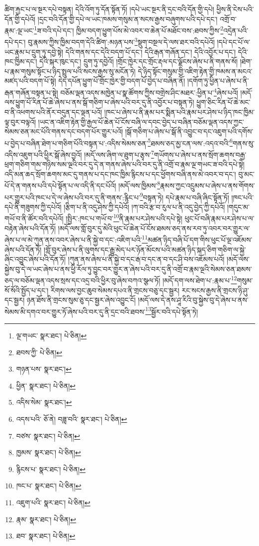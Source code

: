 ཚིག་རྐྱང་པ་ལ་སྔར་དཔེ་བསྟན། དེའི་འོག་ཏུ་དོན་སྟོན་ཏོ། །དཔེ་ཡང་སྔར་ནི་དྲང་བའི་དོན་གྱི་དཔེ། ཕྱིས་ནི་ངེས་པའི་དོན་གྱི་དཔེའོ། །དྲང་བའི་དོན་གྱི་དཔེ་ལ་ཡང་ཁམས་གསུམ་ན་སངས་རྒྱས་བཞུགས་པའི་དཔེ་དང་། འགྲོ་བ་རྣམ་:ལྔ་ཡང་\footnote{ལྔ་གཡང་  སྣར་ཐང་།  པེ་ཅིན། }ཟ་བའི་དཔེ་དང་། ཁྱིམ་བདག་ཕྱུག་པོས་མེ་འབར་བ་ཆེན་པོ་མཐོང་བས་:ཐབས་ཀྱིས་\footnote{ཐབས་ཀྱི་  པེ་ཅིན། }འདྲེན་པའི་དཔེ་དང་། བུ་རྣམས་ཀྱིས་ཁྱིམ་བདག་དེའི་ཚིག་:མཉན་པས་\footnote{གཉན་པས་  སྣར་ཐང་། }སྡུག་བསྔལ་དེ་ལས་ཐར་བའི་དཔེའོ། །དཔེ་དང་པོ་ལ་ཡང་རྣམ་པ་དྲུག་ཏུ་དབྱེ་སྟེ། དེའི་གནས་དང་དེའི་བདག་པོ་དང་། དེའི་རྒན་གཞོན་དང་། དེའི་འབྱོར་པ་དང་། དེའི་ཁང་ཁྱིམ་དང་། དེའི་སྐར་ཁུང་དང་། དྲུག་ཏུ་དབྱེའོ། །གྲོང་ཁྱེར་དང་གྲོང་རྡལ་དང་ལྗོངས་ཞེས་པ་ནི་གནས་སོ། །ཐེག་པ་རྣམ་གསུམ་སྟོང་པ་ཉིད་སྤྲུལ་པའི་སངས་རྒྱས་སུ་མངོན་ཏེ། དེ་ཉིད་སྟོང་གསུམ་གྱི་འཇིག་རྟེན་གྱི་ཁམས་ན་མངའ་མཛད་པའི་བདག་པོ་སྟེ། དེད་དཔོན་ཕྱུག་པོ་གྲོང་ཁྱེར་གྱི་བདག་པོ་བྱེད་པ་བཞིན་ནོ། །དགོག་ཏུ་ཕྱིན་པ་ཞེས་པ་ནི་རྒན་གཞོན་བསྟན་པ་སྟེ། བཅོམ་ལྡན་འདས་མཁྱེན་པ་སྣ་ཚོགས་ཀྱིས་བགྲེས་ཤིང་མཐར་:ཕྱིན་པ་\footnote{ཕྱིན་  སྣར་ཐང་།  པེ་ཅིན། }ཞེས་པའོ། །མདོ་ལས་ཕྱུག་པོ་རིན་པོ་ཆེ་ཞེས་པ་ནས་སྒོ་གཅིག་པ་ཞེས་པའི་བར་དུ་ནི་འབྱོར་པ་བསྟན་ཏེ། ཕྱུག་ཅིང་རིན་པོ་ཆེ་མང་བ་ནི་འཕགས་པའི་ནོར་བདུན་དང་ལྡན་པའོ། །ཁང་པ་ཞེས་པ་ནི་རྣམ་པར་སྨིན་པའི་རྣམ་པར་ཤེས་པ་ཉིད་ཁང་ཁྱིམ་ལྟ་བུར་བལྟའོ། །ཡང་ན་འཇིག་རྟེན་གྱི་རྒྱལ་པོ་ཆེན་པོ་ངོས་བཞི་ལ་དབང་བྱེད་པ་བཞིན་བཅོམ་ལྡན་འདས་ཀྱང་སེམས་ཅན་མང་པོའི་གནས་དང་བདག་པོར་གྱུར་པའོ། །སྒོ་གཅིག་པ་ཞེས་པ་སྒོ་ནི་འབྱུང་བ་དང་འཇུག་པའི་དགོས་པ་བྱེད་པ་བཞིན་ཐེག་པ་གཅིག་པོའི་བསྟན་པ་:འདིས་སེམས་ཅན་\footnote{འདིས་སེམ་  སྣར་ཐང་། }ཐམས་ཅད་མྱ་ངན་ལས་:འདའ་བའི་\footnote{འདས་པའི་  ཅོ་ནེ། བཟླ་བའི་  སྣར་ཐང་།  པེ་ཅིན། }གནས་སུ་འདིས་འཇུག་པའི་ཕྱིར་སྒོ་ཞེས་བྱའོ། །མདོ་ལས་ཞིག་ལ་ཐུག་པ་རྩྭས་\footnote{བཙས་  སྣར་ཐང་།  པེ་ཅིན། }གཡོགས་པ་ཞེས་པ་ནས་སྲོག་ཆགས་བརྒྱ་ཕྲག་གཅིག་གམ་གཉིས་སམ་ལྔའི་བར་དུ་དེ་ན་གནས་ཞེས་པའི་བར་དུ་ནི་འགྲོ་བ་རྣམ་ལྔ་གཡང་ཟ་བའི་དཔེ་སྟེ། འདི་མན་ཆད་སྲོག་ཆགས་མང་དུ་གནས་པ་དང་ཁང་ཁྱིམ་རྙིངས་པ་དང་ཕྱོགས་བཞི་ནས་མེ་འབར་བ་དང་། བུ་མང་པོ་དེ་ན་གནས་པའི་དཔེ་སྟོན་པ་ལ་འདི་ནི་དང་པོའོ། །མདོ་ལས་ཁྱིམས་\footnote{ཁྱམས་  སྣར་ཐང་།  པེ་ཅིན། }རྣམས་ཀྱང་འདྲུམས་པ་ཞེས་པ་ནས་གོགས་པར་གྱུར་པའི་ཁང་པ་དེ་ལ་ཞེས་པའི་བར་དུ་ནི་གནས་:རྙིང་པ་\footnote{རྙིངས་པ་  སྣར་ཐང་།  པེ་ཅིན། }བསྟན་ཏེ། དཔེ་རྣམ་པ་བཞི་ཞིང་སྟོན་ཏོ། །ཁང་པའི་དཔེ་ནི་གཟུགས་ཀྱི་དཔེའོ། །རྩིག་པ་ནི་འདུ་ཤེས་ཀྱི་དཔེའོ། །ཀ་བའི་རྩ་བ་རུལ་པ་ནི་འདུ་བྱེད་ཀྱི་དཔེའོ། །གདུང་མ་གཡོ་བ་ནི་ཚོར་བའི་དཔེའོ། །སྤྱིར་:ཁང་པ་གཡོ་བ་\footnote{ཁང་པ་  སྣར་ཐང་།  པེ་ཅིན། }ནི་རྣམ་པར་ཤེས་པའི་དཔེ་སྟེ། ཕུང་པོ་བཞི་རྣམ་པར་ཤེས་པ་ལ་བརྟེན་ཞེས་པའི་དོན་ཏོ། །མདོ་ལས་གློ་བུར་དུ་མེའི་ཕུང་པོ་ཆེན་པོ་ངོས་ཐམས་ཅད་ནས་རབ་ཏུ་འབར་བར་གྱུར་ལ་ཞེས་པ་ལ་མེ་ཀུན་ནས་འབར་ཞེས་པ་ནི་སྐྱེ་བ་དང་:འཇིག་པའི་\footnote{འཇུག་པའི་  སྣར་ཐང་།  པེ་ཅིན། }མཚན་ཉིད་བཞི་པོ་དག་གིས་ཕུང་པོ་ལྔ་འཇོམས་ཞེས་པའི་དོན་ཏོ། །གློ་བུར་ཞེས་པ་ནི་ལུགས་དང་རྒྱུ་མེད་པར་ཉོན་མོངས་པའི་མཚན་ཉིད་སྐད་ཅིག་གཅིག་ལ་སྐྱེ་ཞིང་འབྱུང་ཞེས་པའི་དོན་ཏོ། །ཀུན་ནས་ཞེས་པ་ནི་སྐྱེ་བ་དང་རྒ་བ་དང་ན་བ་དང་ཤི་བས་འཇོམས་པའོ། །མདོ་ལས་སྐྱེས་བུ་དེ་ལ་ཡང་ཞེས་པ་ནས་ཕྱི་རོལ་ཏུ་བྱུང་བར་གྱུར་ན་ཞེས་པའི་བར་དུ་ནི་འགྲོ་བ་རྣམ་ལྔའི་སེམས་ཅན་ཐམས་ཅད་ལ་བཅོམ་ལྡན་འདས་སྲས་དང་འདྲ་བའི་ཕྱིར་བུ་ཞེས་བཀའ་སྩལ་ཏོ། །མདོ་དག་ལས་ཐེག་པ་:རྣམ་པ་\footnote{རྣམ་  སྣར་ཐང་།  པེ་ཅིན། }གསུམ་སོ་སོའི་སྤྱོད་པ་དང་། རིགས་ལས་བྱང་ཆུབ་སེམས་དཔའ་ནི་གྲངས་བཅུ་དང་སྦྱར། རང་སངས་རྒྱས་ནི་གྲངས་ཉི་ཤུ་དང་སྦྱར། ཉན་ཐོས་ནི་གྲངས་སུམ་ཅུ་དང་སྦྱར་ཞེས་འབྱུང་ངོ། །མདོ་ལས་དེ་ནས་ཤཱ་རིའི་བུ་སྐྱེས་བུ་དེ་ཞེས་པ་ནས་སེམས་མི་དགའ་བར་གྱུར་ཏོ་ཞེས་པའི་བར་དུ་ནི་དྲང་བའི་ཐབས་\footnote{ཐབ་  སྣར་ཐང་།  པེ་ཅིན། }སྦྱོར་བའི་དཔེ་སྟོན་ཏེ། 